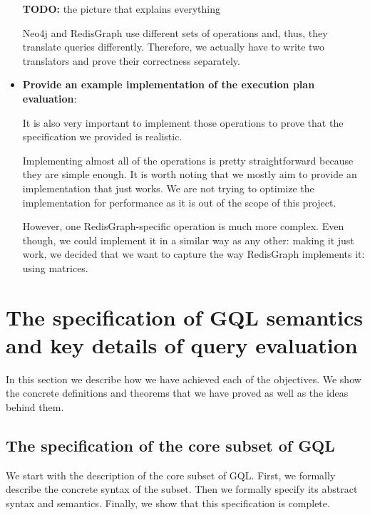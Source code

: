 \documentclass[14pt]{constructor-thesis}
\theoremstyle{definition}
\newcommand{\todo}[1]{
  \begin{tcolorbox}[colframe=red!75!black,colback=red!5!white,arc=0pt,fonttitle=\bfseries]
  \textbf{TODO:} #1
  \end{tcolorbox}
}
\begin{document}
\begin{itemize}
  \todo{the picture that explains everything}


  Neo4j and RedisGraph use different sets of operations and, thus, they translate queries differently. Therefore, we actually have to write two translators and prove their correctness separately.

  \item \textbf{Provide an example implementation of the execution plan evaluation}:
  
  It is also very important to implement those operations to prove that the specification we provided is realistic.
  
  Implementing almost all of the operations is pretty straightforward because they are simple enough. It is worth noting that we mostly aim to provide an implementation that just works. We are not trying to optimize the implementation for performance as it is out of the scope of this project.

  However, one RedisGraph-specific operation is much more complex. Even though, we could implement it in a similar way as any other: making it just work, we decided that we want to capture the way RedisGraph implements it: using matrices. 
  

\end{itemize}

\section{The specification of GQL semantics and key details of query evaluation}
\label{sec:technical-details}

In this section we describe how we have achieved each of the objectives. We show the concrete definitions and theorems that we have proved as well as the ideas behind them.

\subsection{The specification of the core subset of GQL}

We start with the description of the core subset of GQL. First, we formally describe the concrete syntax of the subset. Then we formally specify its abstract syntax and semantics. Finally, we show that this specification is complete.
\end{document}
